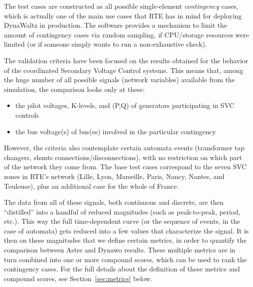 \documentclass[11pt, a4paper, twoside, titlepage]{article}
\begin{document}
The test cases are constructed as all possible single-element
\emph{contingency} cases, which is actually one of the main use cases
that RTE has in mind for deploying DynaWaltz in production. The
software provides a mechanism to limit the amount of contingency cases
via random sampling, if CPU/storage resources were limited (or if
someone simply wants to run a non-exhaustive check).

The validation criteria have been focused on the results obtained for
the behavior of the coordinated Secondary Voltage Control
systems. This means that, among the huge number of all possible
signals (network variables) available from the simulation, the
comparison looks only at these:
\begin{itemize}
\item the pilot voltages, K-levels, and (P,Q) of generators
  participating in SVC controls
\item the bus voltage(s) of bus(es) involved in the particular
  contingency
\end{itemize}
However, the criteria also contemplate certain automata events
(transformer tap changers, shunts connections/disconnections), with no
restriction on which part of the network they come from.  The base
test cases correspond to the seven SVC zones in RTE's network (Lille,
Lyon, Marseille, Paris, Nancy, Nantes, and Toulouse), plus an
additional case for the whole of France.

The data from all of these signals, both continuous and discrete, are
then ``distilled'' into a handful of reduced magnitudes (such as
peak-to-peak, period, etc.). This way the full time-dependent curve
(or the sequence of events, in the case of automata) gets reduced into
a few values that characterize the signal. It is then on these
magnitudes that we define certain metrics, in order to quantify the
comparison between Astre and Dynawo results. These multiple metrics
are in turn combined into one or more compound scores, which can be
used to rank the contingency cases.  For the full details about the
definition of these metrics and compound scores, see
Section~\ref{sec:metrics} below.
\end{document}
